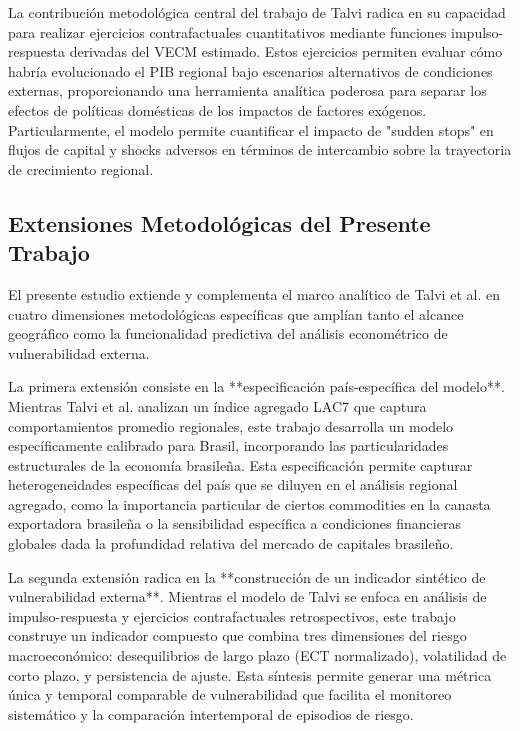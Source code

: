 \documentclass[3p,11pt]{elsarticle}
\begin{document}
La contribución metodológica central del trabajo de Talvi radica en su capacidad para realizar ejercicios contrafactuales cuantitativos mediante funciones impulso-respuesta derivadas del VECM estimado. Estos ejercicios permiten evaluar cómo habría evolucionado el PIB regional bajo escenarios alternativos de condiciones externas, proporcionando una herramienta analítica poderosa para separar los efectos de políticas domésticas de los impactos de factores exógenos. Particularmente, el modelo permite cuantificar el impacto de "sudden stops" en flujos de capital y shocks adversos en términos de intercambio sobre la trayectoria de crecimiento regional.

\subsection{Extensiones Metodológicas del Presente Trabajo}

El presente estudio extiende y complementa el marco analítico de Talvi et al. en cuatro dimensiones metodológicas específicas que amplían tanto el alcance geográfico como la funcionalidad predictiva del análisis econométrico de vulnerabilidad externa.

La primera extensión consiste en la **especificación país-específica del modelo**. Mientras Talvi et al. analizan un índice agregado LAC7 que captura comportamientos promedio regionales, este trabajo desarrolla un modelo específicamente calibrado para Brasil, incorporando las particularidades estructurales de la economía brasileña. Esta especificación permite capturar heterogeneidades específicas del país que se diluyen en el análisis regional agregado, como la importancia particular de ciertos commodities en la canasta exportadora brasileña o la sensibilidad específica a condiciones financieras globales dada la profundidad relativa del mercado de capitales brasileño.

La segunda extensión radica en la **construcción de un indicador sintético de vulnerabilidad externa**. Mientras el modelo de Talvi se enfoca en análisis de impulso-respuesta y ejercicios contrafactuales retrospectivos, este trabajo construye un indicador compuesto que combina tres dimensiones del riesgo macroeconómico: desequilibrios de largo plazo (ECT normalizado), volatilidad de corto plazo, y persistencia de ajuste. Esta síntesis permite generar una métrica única y temporal comparable de vulnerabilidad que facilita el monitoreo sistemático y la comparación intertemporal de episodios de riesgo.
\end{document}
